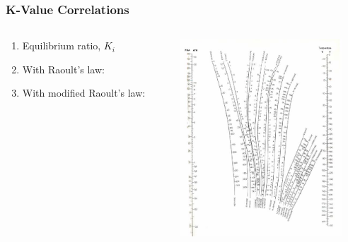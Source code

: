 \documentclass[10pt,compress,unknownkeysallowed]{beamer}
\begin{document}
\begin{frame}
  \frametitle{K-Value Correlations}
  \begin{columns}
     \begin{column}[l]{0.5\linewidth}
        \begin{enumerate}
           \item<1-> Equilibrium ratio, $K_{i}$
           \item<2-> With Raoult's law:
           \item<3-> With modified Raoult's law:
        \end{enumerate}
     \end{column}
     \begin{column}[l]{0.5\linewidth}
        \begin{center}
            \hspace{-.8cm}\includegraphics[width=6.1cm,clip]{./../Pics/02_07_fig_02.png}
        \end{center}
     \end{column}
   \end{columns}
\end{frame}
\end{document}
